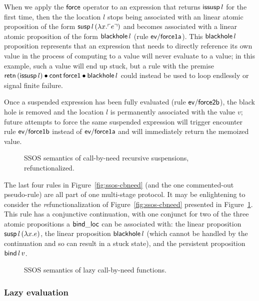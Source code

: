 When we apply the ${\sf force}$ operator to an expression that returns
${\sf issusp}\,l$ for the first time, then the the location $l$ stops
being associated with an linear atomic proposition of the form ${\sf
  susp}\,l\,(\lambda x.{\ulcorner{e}\urcorner})$ and becomes associated with a
linear atomic proposition of the form ${\sf blackhole}\,l$ (rule ${\sf
  ev/force1a}$). This ${\sf blackhole}\,l$ proposition represents that
an expression that needs to directly reference its own value in the
process of computing to a value will never evaluate to a value; in
this example, such a value will end up stuck, but a rule with the
premise ${\sf retn}\,({\sf issusp}\,l) \mathbin{\bullet} {\sf cont}\,{\sf force1}
\mathbin{\bullet} {\sf blackhole}\,l$ could instead be used to loop endlessly 
or signal finite failure. 

Once a suspended expression has been fully evaluated (rule ${\sf ev/force2b}$),
the black hole is removed and the location $l$ is permanently associated
with the value $v$; future attempts to force the same suspended
expression will trigger encounter rule ${\sf ev/force1b}$ instead of 
${\sf ev/force1a}$ and will immediately return the memoized value.

\begin{figure}
\caption{SSOS semantics of call-by-need recursive suspensions, refunctionalized.}
\label{fig:ssos-cbneed-refun}
\end{figure}

The last four rules in Figure~\ref{fig:ssos-cbneed} (and the one
commented-out pseudo-rule) are all part of one multi-stage protocol.
It may be enlightening to consider the {\it re}functionalization of
Figure~\ref{fig:ssos-cbneed} presented in
Figure~\ref{fig:ssos-cbneed-refun}. This rule has a conjunctive
continuation, with one conjunct for two of the three atomic propositions a
${\sf bind\_loc}$ can be associated with: the linear proposition
${\sf susp}\,l\,(\lambda x.e)$, the linear proposition 
${\sf blackhole}\,l$ (which cannot be handled by the continuation and 
so can result in a stuck state), and the persistent proposition
${\sf bind}\,l\,v$. 

\begin{figure}
\caption{SSOS semantics of lazy call-by-need functions.}
\label{fig:ssos-by-need}
\end{figure}


\subsubsection{Lazy evaluation}

